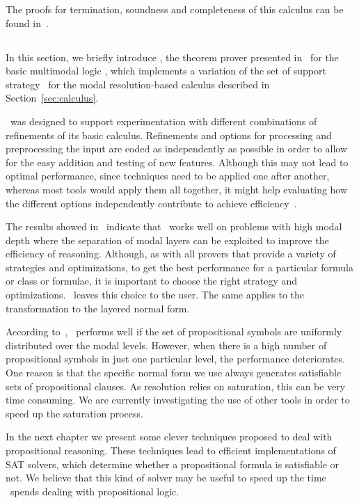 The proofs for termination, soundness and completeness of this calculus can be
found in~\cite{nalon2015modal}.

\subsection{\ksp}
In this section, we briefly introduce \ksp, the theorem prover presented
in~\cite{Nalon2016} for the basic multimodal logic , which
implements a variation of the set of support strategy~\cite{wos1965efficiency}
for the modal resolution-based calculus described in Section~\ref{sec:calculus}.

\ksp\ was designed to support experimentation with different combinations of
refinements of its basic calculus. Refinements and options for processing and
preprocessing the input are coded as independently as possible in order to allow
for the easy addition and testing of new features. Although this may not lead
to optimal performance, since techniques need to be applied one after another,
whereas most tools would apply them all together, it might help 
evaluating how the different options independently contribute to achieve
efficiency~\cite{Nalon2016}. 

The results showed in~\cite{Nalon2016} indicate that \ksp\ works well on
problems with high modal depth where the separation of modal layers can be
exploited to improve the efficiency of reasoning. Although, as with all provers
that provide a variety of strategies and optimizations, to get the best
performance for a particular formula or class or formulae, it is important to
choose the right strategy and optimizations. \ksp\ leaves this choice to the
user. The same applies to the transformation to the layered normal form.

According to~\cite{Nalon2016}, \ksp\ performs well if the set of propositional
symbols are uniformly distributed over the modal levels. However, when there is
a high number of propositional symbols in just one particular level, the
performance deteriorates. One reason is that the specific normal form we use
always generates satisfiable sets of propositional clauses. As resolution relies
on saturation, this can be very time consuming. We are currently investigating
the use of other tools in order to speed up the saturation process.

In the next chapter we present some clever techniques proposed to deal with
propositional reasoning. These techniques lead to efficient implementations of
SAT solvers, which determine whether a propositional formula is satisfiable or
not. We believe that this kind of solver may be useful to speed up the time
\ksp\ spends dealing with propositional logic.
